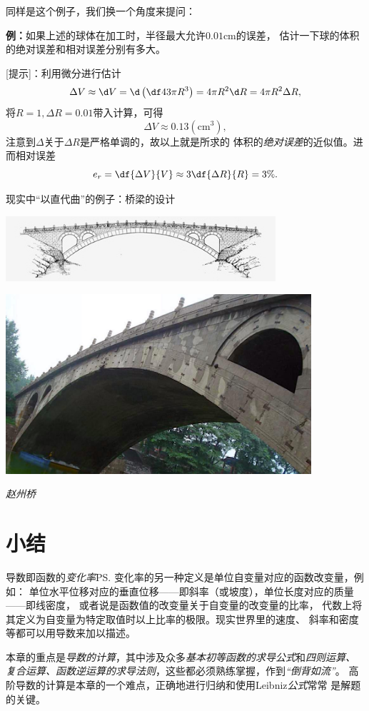 同样是这个例子，我们换一个角度来提问：

{\bf 例：}如果上述的球体在加工时，半径最大允许$0.01$cm的误差，
估计一下球的体积的绝对误差和相对误差分别有多大。

[提示]：利用微分进行估计
$$\Delta V\approx \d V=\d\left(\df43\pi R^3\right)
=4\pi R^2\d R=4\pi R^2\Delta R,$$
将$R=1,\Delta R=0.01$带入计算，可得
$$\Delta V\approx 0.13(\mbox{cm}^3),$$
注意到$\Delta$关于$\Delta R$是严格单调的，故以上就是所求的
体积的{\it 绝对误差}的近似值。进而相对误差
$$e_r=\df{\Delta V}{V}\approx 3\df{\Delta R}{R}=3\%.$$

现实中“以直代曲”的例子：桥梁的设计

\begin{center}
	\includegraphics[width=0.75\textwidth]{./images/ch2/archBridge-1.jpg}
	
	\includegraphics[width=0.85\textwidth]{./images/ch2/zhaozhouqiao.jpg}
	
	\it 赵州桥
\end{center}

\section{小结}

导数即函数的{\it 变化率}\ps{变化率的另一种定义是单位自变量对应的函数改变量，例如：
单位水平位移对应的垂直位移——即斜率（或坡度），单位长度对应的质量——即线密度}，
或者说是函数值的改变量关于自变量的改变量的比率，
代数上将其定义为自变量为特定取值时以上比率的极限。现实世界里的速度、
斜率和密度等都可以用导数来加以描述。

本章的重点是{\it 导数的计算}，其中涉及众多{\it 基本初等函数的求导公式}和{\it 四则运算、
复合运算、函数逆运算的求导法则}，这些都必须熟练掌握，作到{\it “倒背如流”}。
高阶导数的计算是本章的一个难点，正确地进行归纳和使用Leibniz{\it 公式}常常
是解题的关键。

